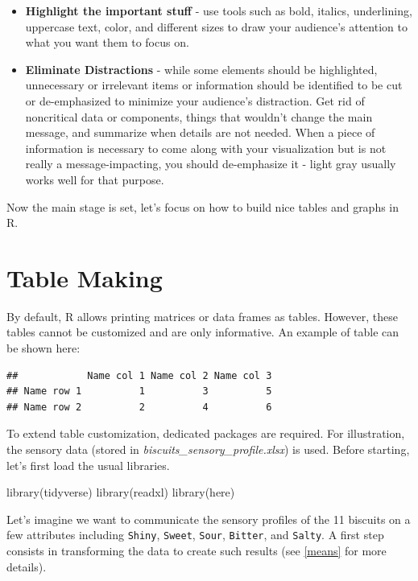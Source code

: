 \documentclass[
]{krantz}
\makeatletter
\newenvironment{Shaded}{\begin{snugshade}}{\end{snugshade}}
\newcommand{\FunctionTok}[1]{\textcolor[rgb]{0,0,0}{#1}}
\newcommand{\NormalTok}[1]{#1}
\providecommand{\tightlist}{%
  \setlength{\itemsep}{0pt}\setlength{\parskip}{0pt}}
\newenvironment{kframe}{%
\medskip{}
\setlength{\fboxsep}{.8em}
 \def\at@end@of@kframe{}%
 \ifinner\ifhmode%
  \def\at@end@of@kframe{\end{minipage}}%
  \begin{minipage}{\columnwidth}%
 \fi\fi%
 \def\FrameCommand##1{\hskip\@totalleftmargin \hskip-\fboxsep
 \colorbox{shadecolor}{##1}\hskip-\fboxsep
     \hskip-\linewidth \hskip-\@totalleftmargin \hskip\columnwidth}%
 \MakeFramed {\advance\hsize-\width
   \@totalleftmargin\z@ \linewidth\hsize
   \@setminipage}}%
 {\par\unskip\endMakeFramed%
 \at@end@of@kframe}
\renewenvironment{Shaded}{\begin{kframe}}{\end{kframe}}
\makeatother
\begin{document}
\begin{itemize}
\tightlist
\item
  \textbf{Highlight the important stuff} - use tools such as bold, italics, underlining, uppercase text, color, and different sizes to draw your audience's attention to what you want them to focus on.
\item
  \textbf{Eliminate Distractions} - while some elements should be highlighted, unnecessary or irrelevant items or information should be identified to be cut or de-emphasized to minimize your audience's distraction. Get rid of noncritical data or components, things that wouldn't change the main message, and summarize when details are not needed. When a piece of information is necessary to come along with your visualization but is not really a message-impacting, you should de-emphasize it - light gray usually works well for that purpose.
\end{itemize}

Now the main stage is set, let's focus on how to build nice tables and graphs in R.

\hypertarget{tablemaking}{%
\section{Table Making}\label{tablemaking}}

By default, R allows printing matrices or data frames as tables. However, these tables cannot be customized and are only informative. An example of table can be shown here:

\begin{verbatim}
##            Name col 1 Name col 2 Name col 3
## Name row 1          1          3          5
## Name row 2          2          4          6
\end{verbatim}

To extend table customization, dedicated packages are required. For illustration, the sensory data (stored in \emph{biscuits\_sensory\_profile.xlsx}) is used.
Before starting, let's first load the usual libraries.

\begin{Shaded}
\begin{Highlighting}[]
\FunctionTok{library}\NormalTok{(tidyverse)}
\FunctionTok{library}\NormalTok{(readxl)}
\FunctionTok{library}\NormalTok{(here)}
\end{Highlighting}
\end{Shaded}

Let's imagine we want to communicate the sensory profiles of the 11 biscuits on a few attributes including \texttt{Shiny}, \texttt{Sweet}, \texttt{Sour}, \texttt{Bitter}, and \texttt{Salty}. A first step consists in transforming the data to create such results (see \ref{means} for more details).
\end{document}

